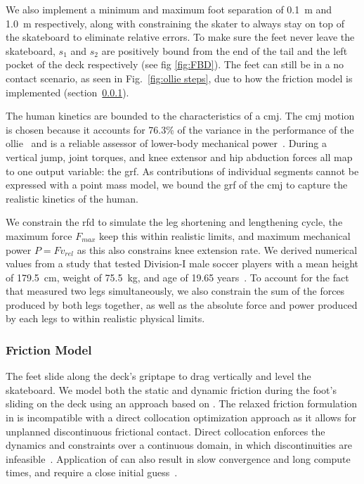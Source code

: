 \documentclass[default,iicol]{sn-jnl}
\begin{document}
We also implement a minimum and maximum foot separation of \SI{0.1}{\meter} and \SI{1.0}{\meter} respectively, along with constraining the skater to always stay on top of the skateboard to eliminate relative errors.
To make sure the feet never leave the skateboard, $s_1$ and $s_2$ are positively bound from the end of the tail and the left pocket of the deck respectively (see fig \ref{fig:FBD}).
The feet can still be in a no contact scenario, as seen in Fig.~\ref{fig:ollie steps}, due to how the friction model is implemented (section~\ref{ss_friction}).

The human kinetics are bounded to the characteristics of a \gls{cmj}.
The \gls{cmj} motion is chosen because it accounts for 76.3\% of the variance in the performance of the ollie~\cite{candotti_lower_2012} and is a reliable assessor of lower-body mechanical power~\cite{barker_relationships_2018}.
During a vertical jump, joint torques, and knee extensor and hip abduction forces all map to one output variable: the \gls{grf}.
As contributions of individual segments cannot be expressed with a point mass model, we bound the \gls{grf} of the \gls{cmj} to capture the realistic kinetics of the human.

We constrain the \gls{rfd} to simulate the leg shortening and lengthening cycle, the maximum force $F_{max}$ keep this within realistic limits, and maximum mechanical power $P = F v_{rel}$ as this also constrains knee extension rate. We derived numerical values from a study that tested Division-I male soccer players with a mean height of \SI{179.5}{\centi\meter}, weight of \SI{75.5}{\kilo\gram}, and age of 19.65 years~\cite{barker_relationships_2018}. To account for the fact that \cite{barker_relationships_2018} measured two legs simultaneously, we also constrain the sum of the forces produced by both legs together, as well as the absolute force and power produced by each legs to within realistic physical limits.

\subsubsection{Friction Model} \label{ss_friction}
The feet slide along the deck's griptape to drag vertically and level the skateboard. We model both the static and dynamic friction during the foot's sliding on the deck using an approach based on \cite{patel_contact-implicit_2019}.
The relaxed friction formulation in \cite{patel_contact-implicit_2019} is incompatible with a direct collocation optimization approach as it allows for unplanned discontinuous frictional contact.
Direct collocation enforces the dynamics and constraints over a continuous domain, in which discontinuities are infeasible~\cite{kelly_transcription_2017}.
Application of \cite{patel_contact-implicit_2019} can also result in slow convergence and long compute times, and require a close initial guess~\cite{shield_contact-implicit_2022}.
\end{document}
